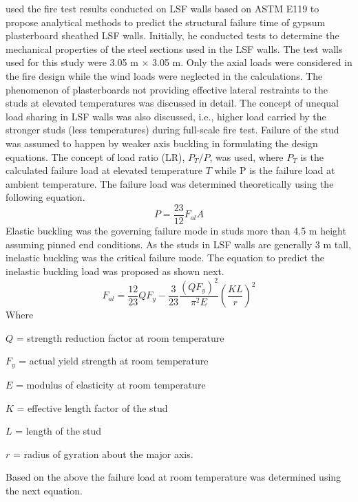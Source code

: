\citet{Klippstein1978} used the fire test results conducted on LSF walls based on ASTM E119 to propose analytical methods to predict the structural failure time of gypsum plasterboard sheathed LSF walls. Initially, he conducted tests to determine the mechanical properties of the steel sections used in the LSF walls. The test walls used for this study were 3.05 m $\times$ 3.05 m. Only the axial loads were considered in the fire design while the wind loads were neglected in the calculations. The phenomenon of plasterboards not providing effective lateral restraints to the studs at elevated temperatures was discussed in detail. The concept of unequal load sharing in LSF walls was also discussed, i.e., higher load carried by the stronger studs (less temperatures) during full-scale fire test. Failure of the stud was assumed to happen by weaker axis buckling in formulating the design equations. The concept of load ratio (LR), $P_T/P$, was used, where $P_T$ is the calculated failure load at elevated temperature $T$ while P is the failure load at ambient temperature. The failure load was determined theoretically using the following equation.
\begin{equation}
	P = \dfrac{23}{12} F_{al}A
\end{equation}
Elastic buckling was the governing failure mode in studs more than 4.5 m height assuming pinned end conditions. As the studs in LSF walls are generally 3 m tall, inelastic buckling was the critical failure mode. The equation to predict the inelastic buckling load was proposed as shown next. 
\begin{equation}\label{eq:inelastic}
	F_{al} = \dfrac{12}{23} QF_y-\dfrac{3}{23}\dfrac{(QF_y)^2}{\pi^2E}\left(\dfrac{KL}{r}\right)^2 	
\end{equation}
Where
\begin{description}[itemsep=0pt,parsep=0pt]
	\item $Q$ = strength reduction factor at room temperature
	\item $F_y$ = actual yield strength at room temperature
	\item $E$ = modulus of elasticity at room temperature
	\item $K$ = effective length factor of the stud
	\item $L$ = length of the stud
	\item $r$ = radius of gyration about the major axis.
\end{description}	
Based on the above  the failure load at room temperature was determined using the next equation.
